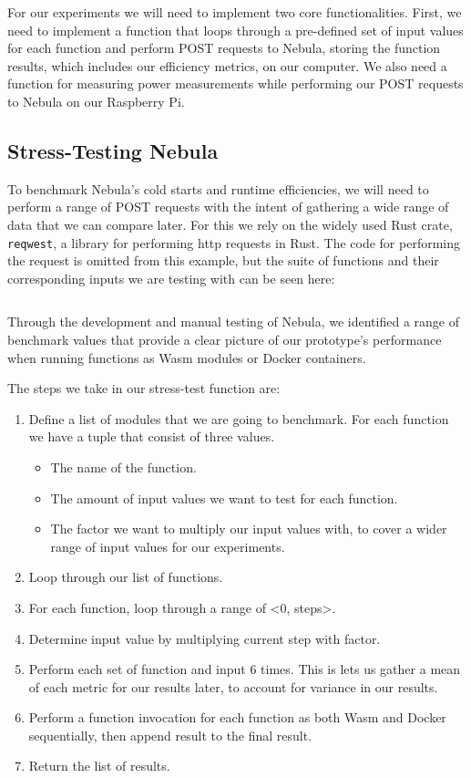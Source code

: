 \documentclass[
  table]{report}
\begin{document}
For our experiments we will need to implement two core functionalities.
First, we need to implement a function that loops through a pre-defined
set of input values for each function and perform POST requests to
Nebula, storing the function results, which includes our efficiency
metrics, on our computer. We also need a function for measuring power
measurements while performing our POST requests to Nebula on our
Raspberry Pi.

\subsection{Stress-Testing Nebula}
\label{sect:stress_test}

To benchmark Nebula's cold starts and runtime efficiencies, we will need
to perform a range of POST requests with the intent of gathering a wide
range of data that we can compare later. For this we rely on the widely
used Rust crate, \texttt{reqwest}, a library for performing http
requests in Rust. The code for performing the request is omitted from
this example, but the suite of functions and their corresponding inputs
we are testing with can be seen here:

\inputminted{rust}{assets/code/request.rs}

Through the development and manual testing of Nebula, we identified a
range of benchmark values that provide a clear picture of our
prototype's performance when running functions as \ac{Wasm} modules or
Docker containers.

The steps we take in our stress-test function are:

\renewcommand{\theenumi}{4.\arabic{enumi}}
\begin{enumerate}
  \item Define a list of modules that we are going to benchmark. For each function we have a tuple that consist of three values.  
    \begin{itemize}
      \item The name of the function.
      \item The amount of input values we want to test for each function.
      \item The factor we want to multiply our input values with, to cover a wider range of input values for our experiments. 
    \end{itemize}
  \item Loop through our list of functions.
  \item For each function, loop through a range of <0, steps>.
  \item Determine input value by multiplying current step with factor.
  \item Perform each set of function and input 6 times. This is lets us gather a mean of each metric for our results later, to account for variance in our results.
  \item Perform a function invocation for each function as both Wasm and Docker sequentially, then append result to the final result.
  \item Return the list of results.
\end{enumerate}
\end{document}
